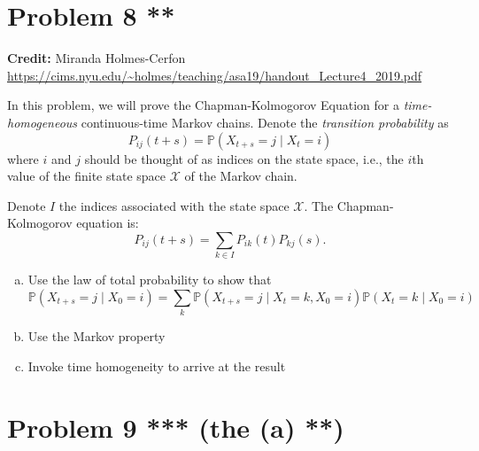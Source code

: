 \documentclass[11pt]{extarticle}
\theoremstyle{plain}
\theoremstyle{definition}
\begin{document}
\vspace{10mm}
\section*{Problem 8 **}

\textbf{Credit:} Miranda Holmes-Cerfon \url{https://cims.nyu.edu/~holmes/teaching/asa19/handout_Lecture4_2019.pdf}

\vspace{5mm}
\noindent
In this problem, we will prove the Chapman-Kolmogorov Equation for a \textit{time-homogeneous} continuous-time Markov chains. Denote the \textit{transition probability} as
\begin{equation*}
	P_{ij}(t+s) = \mathbb P(X_{t+s} = j \mid X_t = i)
\end{equation*}
where $i$ and $j$ should be thought of as indices on the state space, i.e., the $i$th value of the finite state space $\mathcal X$ of the Markov chain.

Denote $I$ the indices associated with the state space $\mathcal X$. The Chapman-Kolmogorov equation is: 
\begin{equation*}
	P_{ij}(t+s) = \sum_{k \in I} P_{ik}(t) P_{kj}(s).
\end{equation*}

\begin{enumerate}[(a)]
\item Use the law of total probability to show that 
\begin{equation*}
	\mathbb P(X_{t+s} = j \mid X_0 = i) = \sum_k \mathbb P(X_{t+s} = j \mid X_t = k, X_0 = i) \mathbb P(X_t = k \mid X_0 = i) 
\end{equation*}

\item Use the Markov property

\item Invoke time homogeneity to arrive at the result
\end{enumerate}



\vspace{10mm}
\section*{Problem 9 *** (the (a) **)}
\end{document}
